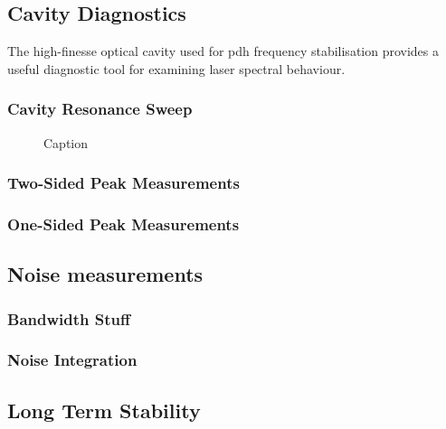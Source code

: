 \subsection{Cavity Diagnostics}

The high-finesse optical cavity used for \gls{pdh} frequency stabilisation provides a useful diagnostic tool for examining laser spectral behaviour.

\subsubsection{Cavity Resonance Sweep}

\begin{figure}
\center

\caption{Caption}
\label{figure:cavity_scans}
\end{figure}

\subsubsection{Two-Sided Peak Measurements}

\subsubsection{One-Sided Peak Measurements}

\subsection{Noise measurements}

\subsubsection{Bandwidth Stuff}

\subsubsection{Noise Integration}

\subsection{Long Term Stability}

